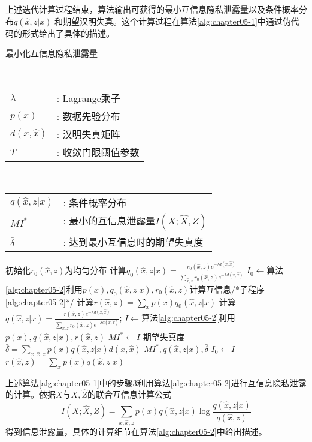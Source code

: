 上述迭代计算过程结束，算法输出可获得的最小互信息隐私泄露量以及条件概率分布$q(\hat{x},z|x)$ 和期望汉明失真。这个计算过程在算法\ref{alg:chapter05-1}中通过伪代码的形式给出了具体的描述。
\begin{algorithm}[htbp]
 \small
\caption{ 最小化互信息隐私泄露量}
\label{alg:chapter05-1}
\begin{algorithmic}[1]
\REQUIRE ~~\\
\begin{tabular}[t]{p{8mm}l}
 $\lambda$&:  Lagrange乘子\\
 $p(x)$&: 数据先验分布\\
 $d(x,\hat{x})$&: 汉明失真矩阵\\
 $T$&: 收敛门限阈值参数
\end{tabular}
\ENSURE ~~\\
\begin{tabular}[t]{p{8mm}l}
$q(\hat{x},z|x)$&: 条件概率分布\\
$MI^*$&: 最小的互信息泄露量$I(X;\hat{X},Z)$\\
$\bar{\delta}$&: 达到最小互信息时的期望失真度
\end{tabular}
\STATE 初始化$r_0(\hat{x},z)$为均匀分布
\STATE 计算$q_0(\hat{x},z|x)=\frac{r_0(\hat{x},z)e^{-\lambda d(x,\hat{x})}}{\sum_{\hat{x},z}r_0(\hat{x},z)e^{-\lambda d(x,\hat{x})}}$
\STATE $I_0\leftarrow $算法\ref{alg:chapter05-2}利用$p(x),q_0(\hat{x},z|x),r_0(\hat{x},z)$计算互信息/*子程序\ref{alg:chapter05-2}*/
\STATE 计算$r(\hat{x},z)=\sum_{x}p(x)q_0(\hat{x},z|x)$
\STATE 计算$q(\hat{x},z|x)=\frac{r(\hat{x},z)e^{-\lambda d(x,\hat{x})}}{\sum_{\hat{x},z}r_0(\hat{x},z)e^{-\lambda d(x,\hat{x})}}$;
\STATE $I \leftarrow $算法\ref{alg:chapter05-2}利用$p(x),q(\hat{x},z|x),r(\hat{x},z)$
\STATE $MI^* \leftarrow I$
\STATE 期望失真度$\bar{\delta}=\sum_{x,\hat{x},z}p(x)q(\hat{x},z|x)d(x,\hat{x})$
\RETURN $MI^*, q(\hat{x},z|x), \bar{\delta}$
\ELSE
\STATE $I_0 \leftarrow I$
\STATE $r(\hat{x},z)=\sum_{x}p(x)q(\hat{x},z|x)$
\ENDIF
\ENDWHILE
\end{algorithmic}
\end{algorithm}

上述算法\ref{alg:chapter05-1}中的步骤$3$利用算法\ref{alg:chapter05-2}进行互信息隐私泄露的计算。依据$X$与$X,\hat{Z}$的联合互信息计算公式
\begin{equation}
	I(X;\hat{X},Z)=\sum_{x,\hat{x},z}p(x)q(\hat{x},z|x) \log \frac{q(\hat{x},z|x)}{q(\hat{x},z)}
\end{equation}
得到信息泄露量，具体的计算细节在算法\ref{alg:chapter05-2}中给出描述。

